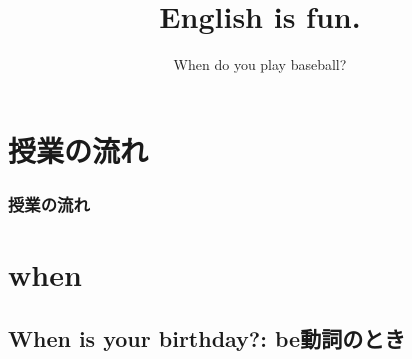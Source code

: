 \documentclass[aspectratio=169,xcolor={dvipsnames,table}]{beamer}
\title{English is fun.}
\subtitle{When do you play baseball?}
\author{}
\institute[]{}
\date[]
\begin{document}
\begin{frame}[plain]
  \titlepage
\end{frame}

\section*{授業の流れ}
\begin{frame}[plain]
  \frametitle{授業の流れ}
  \tableofcontents
\end{frame}

\section{when }
\subsection{When is your birthday?: be動詞のとき}
\end{document}
